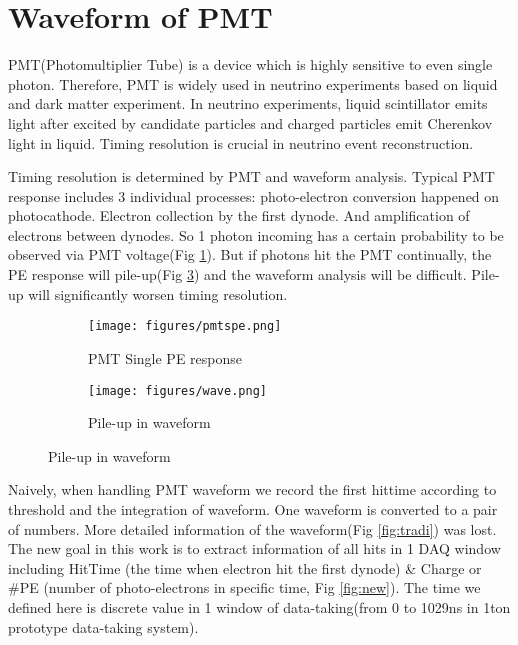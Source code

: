 \section{Waveform of PMT} %
PMT(Photomultiplier Tube) is a device which is highly sensitive to even single photon. Therefore, PMT is widely used in neutrino experiments based on liquid and dark matter experiment. In neutrino experiments, liquid scintillator emits light after excited by candidate particles and charged particles emit Cherenkov light in liquid. Timing resolution is crucial in neutrino event reconstruction. 

Timing resolution is determined by PMT and waveform analysis. Typical PMT response includes 3 individual processes: photo-electron conversion happened on photocathode. Electron collection by the first dynode. And amplification of electrons between dynodes. So 1 photon incoming has a certain probability to be observed via PMT voltage(Fig \ref{fig:spe}). But if photons hit the PMT continually, the PE response will pile-up(Fig \ref{fig:pile}) and the waveform analysis will be difficult. Pile-up will significantly worsen timing resolution. 

\begin{figure}[H]
\begin{minipage}{.5\textwidth}
\begin{figure}[H]
    \centering
    \caption{PMT Single PE response}
    \texttt{[image: figures/pmtspe.png]}
    \label{fig:spe}
\end{figure}
\end{minipage}
\begin{minipage}{.5\textwidth}
\begin{figure}[H]
    \centering
    \caption{Pile-up in waveform}
    \texttt{[image: figures/wave.png]}
    \label{fig:pile}
\end{figure}
\end{minipage}
\end{figure}

Naively, when handling PMT waveform we record the first hittime according to threshold and the integration of waveform. One waveform is converted to a pair of numbers. More detailed information of the waveform(Fig \ref{fig:tradi}) was lost. The new goal in this work is to extract information of all hits in 1 DAQ window including HitTime (the time when electron hit the first dynode) \& Charge or \#PE (number of photo-electrons in specific time, Fig \ref{fig:new}). The time we defined here is discrete value in 1 window of data-taking(from 0 to 1029ns in 1ton prototype data-taking system). 

